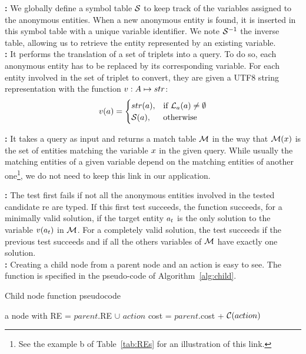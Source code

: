 \textbf{\tovariable: }
We globally define a symbol table $\mathcal{S}$ to keep track of the variables assigned to the anonymous entities. When a new anonymous entity is found, it is inserted in this symbol table with a unique variable identifier. We note $\mathcal{S}^{-1}$ the inverse table, allowing us to retrieve the entity represented by an existing variable. \\

\textbf{\toquery: }
It performs the translation of a set of triplets into a \sparql{} query. To do so, each anonymous entity has to be replaced by its corresponding variable. For each entity involved in the set of triplet to convert, they are given a UTF8 string representation with the function $v: A \mapsto str$: 
\[ 
    v(a) = 
    \begin{cases}
        str(a),& \text{if } \mathcal{L}_a(a) \neq \emptyset\\
        \mathcal{S}(a),& \text{otherwise}
    \end{cases} 
\]

\textbf{\sparqlresult: }
It takes a \sparql{} query as input and returns a match table $\mathcal{M}$ in the way that $\mathcal{M}(x)$ is the set of entities matching the variable $x$ in the given query. While usually the matching entities of a given variable depend on the matching entities of another one\footnote{See the example b of Table~\ref{tab:REs} for an illustration of this link.}, we do not need to keep this link in our application.

\textbf{\goaltest: }
The test first fails if not all the anonymous entities involved in the tested candidate \acrshort{re} are typed. If this first test succeeds, the function succeeds, for a minimally valid solution, if the target entity $a_t$ is the only solution to the variable $v(a_t)$ in $\mathcal{M}$. For a completely valid solution, the test succeeds if the previous test succeeds and if all the others variables of $\mathcal{M}$ have exactly one solution. \\

\textbf{\createchild: } 
Creating a child node from a parent node and an action is easy to see. The \createchild function is specified in the pseudo-code of Algorithm~\ref{alg:child}. 

\begin{algorithm}[ht!]
\caption{\label{alg:child} Child node function pseudocode}
\begin{algorithmic}
    \State \Return a node with
    \State RE = $parent$.RE $\cup$ $action$
    \State cost = $parent$.cost + $\mathcal{C}(action)$
\EndFunction
\end{algorithmic}
\end{algorithm}

